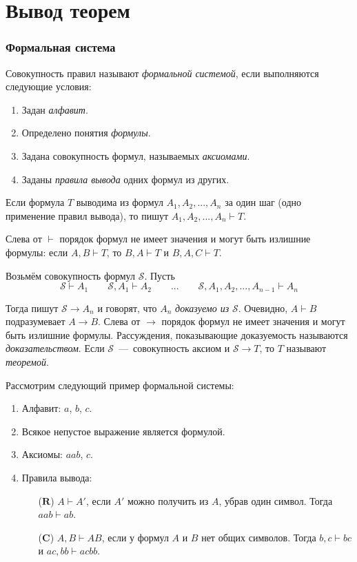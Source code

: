 \part{Вывод теорем}

\section{Формальная система}

Совокупность правил называют {\it формальной системой},
если выполняются следующие условия:
\begin{enumerate}
  \item{}Задан {\it алфавит}.
  \item{}Определено понятия {\it формулы}.
  \item{}Задана совокупность формул, называемых {\it аксиомами}.
  \item{}Заданы {\it правила вывода} одних формул из других.
\end{enumerate}

Если формула $T$ выводима из формул $A_1,A_2,...,A_{n}$ за один шаг (одно применение
правил вывода), то пишут $A_1,A_2,...,A_{n}\vdash T$.

Слева от $\vdash$ порядок формул не имеет значения и могут быть излишние формулы:
если $A,B\vdash T$, то $B,A\vdash T$ и $B,A,C\vdash T$.

\newcommand\Sx{\mathcal S}
Возьмём совокупность формул $\Sx$. Пусть
\[
  \Sx\vdash A_1\qquad
  \Sx,A_1\vdash A_2\qquad...\qquad
  \Sx,A_1,A_2,...,A_{n-1}\vdash A_{n}
\]

Тогда пишут $\Sx\to A_{n}$ и говорят, что $A_{n}$
{\it доказуемо из} $\Sx$.
Очевидно,	$A\vdash B$ подразумевает $A\to B$. Слева от $\to$ порядок формул
не имеет значения и могут быть излишние формулы.
Рассуждения, показывающие доказуемость называются
{\it доказательством}.
Если $\Sx$~---~совокупность аксиом и $\Sx\to T$, то $T$ называют
{\it теоремой}.

\newcommand\ruleR{\mathbf{R}}
\newcommand\ruleC{\mathbf{C}}

Рассмотрим следующий пример формальной системы:
\begin{enumerate}
  \item{}Алфавит: $a$, $b$, $c$.
  \item{}Всякое непустое выражение является формулой.
  \item{}Аксиомы: $aab$, $c$.
  \item{}Правила вывода:
  \begin{multicols}{2}
    \begin{enumerate}
      \item[($\ruleR$)]{}$A\vdash A'$, если $A'$ можно получить из $A$,
      убрав один символ. Тогда $aab\vdash ab$.
      \columnbreak
      \item[($\ruleC$)]{}$A,B\vdash AB$, если у формул $A$ и $B$ нет
      общих символов. Тогда $b,c\vdash bc$ и $ac,bb\vdash acbb$.
    \end{enumerate}
  \end{multicols}
\end{enumerate}


